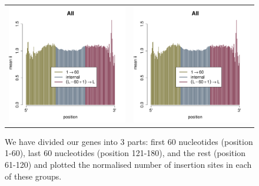 \documentclass[a4paper,10pt, twocolumn]{article}
\begin{document}
\begin{figure}
\begin{tabular}{c c}
\includegraphics[scale=.45, page = 3]{insertion-position-bias.pdf} &
\includegraphics[scale=.45, page = 4]{insertion-position-bias.pdf}
\end{tabular}
\caption{We have divided our genes into 3 parts: first 60 nucleotides (position 1-60), last 60 nucleotides (position 121-180), and the rest (position 61-120) and plotted the normalised number of insertion sites in each of these groups.}
\label{fig:insertion-position-bias}
\end{figure}
\end{document}
